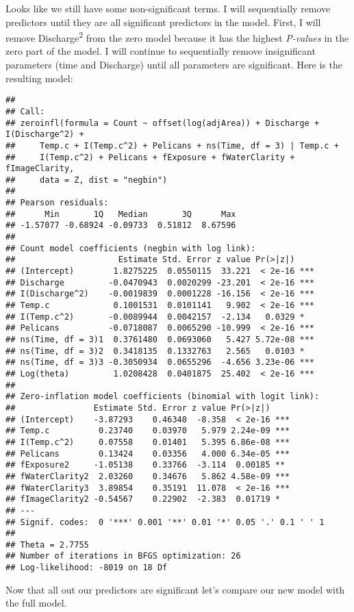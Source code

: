 \documentclass[]{article}
\begin{document}
Looks like we still have some non-significant terms. I will sequentially
remove predictors until they are all significant predictors in the
model. First, I will remove Discharge\textsuperscript{2} from the zero
model because it has the highest \emph{P-values} in the zero part of the
model. I will continue to sequentially remove insignificant parameters
(time and Discharge) until all parameters are significant. Here is the
resulting model:

\begin{verbatim}
## 
## Call:
## zeroinfl(formula = Count ~ offset(log(adjArea)) + Discharge + I(Discharge^2) + 
##     Temp.c + I(Temp.c^2) + Pelicans + ns(Time, df = 3) | Temp.c + 
##     I(Temp.c^2) + Pelicans + fExposure + fWaterClarity + fImageClarity, 
##     data = Z, dist = "negbin")
## 
## Pearson residuals:
##      Min       1Q   Median       3Q      Max 
## -1.57077 -0.68924 -0.09733  0.51812  8.67596 
## 
## Count model coefficients (negbin with log link):
##                     Estimate Std. Error z value Pr(>|z|)    
## (Intercept)        1.8275225  0.0550115  33.221  < 2e-16 ***
## Discharge         -0.0470943  0.0020299 -23.201  < 2e-16 ***
## I(Discharge^2)    -0.0019839  0.0001228 -16.156  < 2e-16 ***
## Temp.c             0.1001531  0.0101141   9.902  < 2e-16 ***
## I(Temp.c^2)       -0.0089944  0.0042157  -2.134   0.0329 *  
## Pelicans          -0.0718087  0.0065290 -10.999  < 2e-16 ***
## ns(Time, df = 3)1  0.3761480  0.0693060   5.427 5.72e-08 ***
## ns(Time, df = 3)2  0.3418135  0.1332763   2.565   0.0103 *  
## ns(Time, df = 3)3 -0.3050934  0.0655296  -4.656 3.23e-06 ***
## Log(theta)         1.0208428  0.0401875  25.402  < 2e-16 ***
## 
## Zero-inflation model coefficients (binomial with logit link):
##                Estimate Std. Error z value Pr(>|z|)    
## (Intercept)    -3.87293    0.46340  -8.358  < 2e-16 ***
## Temp.c          0.23740    0.03970   5.979 2.24e-09 ***
## I(Temp.c^2)     0.07558    0.01401   5.395 6.86e-08 ***
## Pelicans        0.13424    0.03356   4.000 6.34e-05 ***
## fExposure2     -1.05138    0.33766  -3.114  0.00185 ** 
## fWaterClarity2  2.03260    0.34676   5.862 4.58e-09 ***
## fWaterClarity3  3.89854    0.35191  11.078  < 2e-16 ***
## fImageClarity2 -0.54567    0.22902  -2.383  0.01719 *  
## ---
## Signif. codes:  0 '***' 0.001 '**' 0.01 '*' 0.05 '.' 0.1 ' ' 1 
## 
## Theta = 2.7755 
## Number of iterations in BFGS optimization: 26 
## Log-likelihood: -8019 on 18 Df
\end{verbatim}

Now that all out our predictors are significant let's compare our new
model with the full model.
\end{document}
